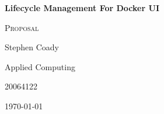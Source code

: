 \begin{titlepage}
	{\huge\bfseries Lifecycle Management For Docker UI\par}
	\vspace{1cm}
	{\scshape\large Proposal \par}
	\vspace{6cm}
	{\Large Stephen Coady\par}
	{\Large Applied Computing\par}
	{\Large 20064122\par}
\vspace{2cm}

{\large \today\par}

	\vfill
	
\end{titlepage}
